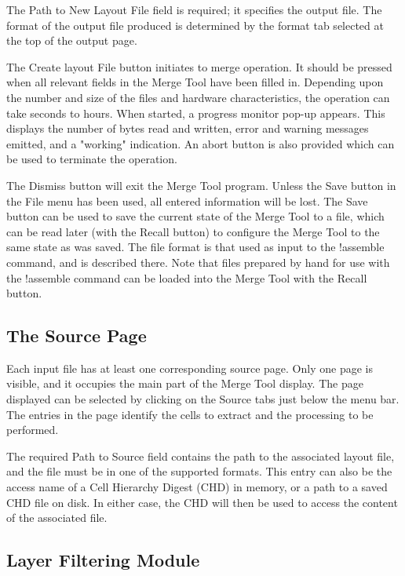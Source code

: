 The {\cb Path to New Layout File} field is required; it specifies the
output file.  The format of the output file produced is determined by
the format tab selected at the top of the output page.

The {\cb Create layout File} button initiates to merge operation.  It
should be pressed when all relevant fields in the {\cb Merge Tool}
have been filled in.  Depending upon the number and size of the files
and hardware characteristics, the operation can take seconds to hours. 
When started, a progress monitor pop-up appears.  This displays the
number of bytes read and written, error and warning messages emitted,
and a "working" indication.  An abort button is also provided which
can be used to terminate the operation.

The {\cb Dismiss} button will exit the {\cb Merge Tool} program. 
Unless the {\cb Save} button in the {\cb File} menu has been used, all
entered information will be lost.  The {\cb Save} button can be used
to save the current state of the {\cb Merge Tool} to a file, which can
be read later (with the {\cb Recall} button) to configure the {\cb
Merge Tool} to the same state as was saved.  The file format is that
used as input to the {\cb !assemble} command, and is described there. 
Note that files prepared by hand for use with the {\cb !assemble}
command can be loaded into the {\cb Merge Tool} with the {\cb Recall}
button.

\subsection{The Source Page}

Each input file has at least one corresponding source page.  Only one
page is visible, and it occupies the main part of the {\cb Merge Tool}
display.  The page displayed can be selected by clicking on the {\cb
Source} tabs just below the menu bar.  The entries in the page
identify the cells to extract and the processing to be performed.

The required {\cb Path to Source} field contains the path to the
associated layout file, and the file must be in one of the supported
formats.  This entry can also be the access name of a Cell Hierarchy
Digest (CHD) in memory, or a path to a saved CHD file on disk.  In
either case, the CHD will then be used to access the content of the
associated file.

\subsection{Layer Filtering Module}

